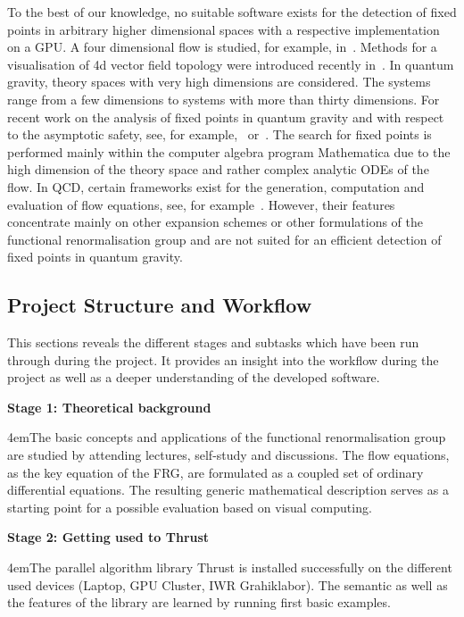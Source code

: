\documentclass[paper=a4,11pt,bibliography=totoc]{scrartcl}
\begin{document}
To the best of our knowledge, no suitable software exists for the detection of fixed points in arbitrary higher dimensional spaces with a respective implementation on a GPU. A four dimensional flow is studied, for example, in~\cite{Noll1967}. Methods for a visualisation of 4d vector field topology were introduced recently in~\cite{Hofmann2018}. In quantum gravity, theory spaces with very high dimensions are considered. The systems range from a few dimensions to systems with more than thirty dimensions. For recent work on the analysis of fixed points in quantum gravity and with respect to the asymptotic safety, see, for example,~\cite{Braun2010, Nicolai2018} or~\cite{Eichhorn2018, Eichhorn2019, Pawlowski2019}. The search for fixed points is performed mainly within the computer algebra program Mathematica due to the high dimension of the theory space and rather complex analytic ODEs of the flow. In QCD, certain frameworks exist for the generation, computation and evaluation of flow equations, see, for example~\cite{Cyrol2017,Huber2012,Mitter2015}. However, their features concentrate mainly on other expansion schemes or other formulations of the functional renormalisation group and are not suited for an efficient detection of fixed points in quantum gravity.

\subsection{Project Structure and Workflow}
\label{sec:proj}

This sections reveals the different stages and subtasks which have been run through during the project. It provides an insight into the workflow during the project as well as a deeper understanding of the developed software.

\textbf{Stage 1: Theoretical background}
\begin{center}
	\leftskip4em\small The basic concepts and applications of the functional renormalisation group are studied by attending lectures, self-study and discussions. The flow equations, as the key equation of the FRG, are formulated as a coupled set of ordinary differential equations. The resulting generic mathematical description serves as a starting point for a possible evaluation based on visual computing.
\end{center}

\textbf{Stage 2: Getting used to Thrust}
\begin{center}
	\leftskip4em\small The parallel algorithm library Thrust is installed successfully on the different used devices (Laptop, GPU Cluster, IWR Grahiklabor). The semantic as well as the features of the library are learned by running first basic examples.
\end{center}
\end{document}
